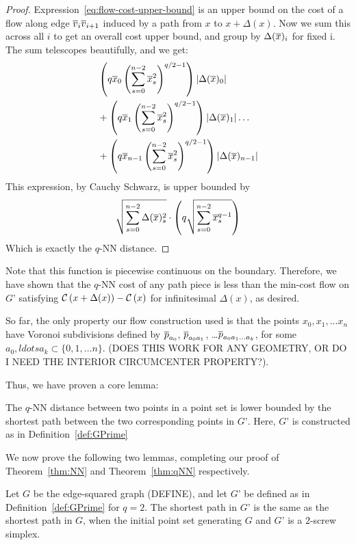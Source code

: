 \begin{proof}
Expression~\ref{eq:flow-cost-upper-bound} is an upper bound on the cost of
a flow along edge $\overline{v}_i\overline{v}_{i+1}$ induced by a path from $x$ to $x+\Delta(x)$. Now we sum this across all $i$ to get an overall cost upper bound, and group by
$\Delta(\overline{x})_i$ for fixed i. The sum telescopes beautifully, and we get:
\begin{align}
&\left(q\overline{x}_0\left(\sum_{s=0}^{n-2} \overline{x}_s^2\right)^{q/2-1}\right)| \Delta(\overline{x})_0|
\\&+
\left(q\overline{x}_1\left(\sum_{s=0}^{n-2} \overline{x}_s^2\right)^{q/2-1}\right)| \Delta(\overline{x})_1|
\ldots
\\& +
\left(q\overline{x}_{n-1}\left(\sum_{s=0}^{n-2} \overline{x}_s^2\right)^{q/2-1}\right)| \Delta(\overline{x})_{n-1}|
\end{align}
This expression, by Cauchy Schwarz, is upper bounded by
\[
\sqrt{\sum_{s=0}^{n-2} \Delta(\overline{x})_s^2} \cdot \left(q\sqrt{\sum_{s=0}^{n-2}
\overline{x}_s^{q-1}}\right)
\]
Which is exactly the $q$-NN distance.

\end{proof}

Note that this function is piecewise continuous on the boundary. Therefore,
we have shown that the $q$-NN cost of any path piece is less than the
min-cost flow on $G’$ satisfying
$\mathcal{C}\left(x+\Delta(x)\right)-\mathcal{C}\left(x\right)$ for infinitesimal
$\Delta(x)$, as desired.

So far, the only property our flow construction used is that the points
$x_0, x_1, \ldots x_n$ have Voronoi subdivisions defined by $\overline{p}_{a_0}$,
$\overline{p}_{a_0a_1}$, \ldots $\overline{p}_{a_0a_1\ldots a_k}$, for some $a_0, ldots a_k
\subset \{0, 1, \ldots n\}$. (DOES THIS WORK FOR ANY GEOMETRY, OR DO I NEED
THE INTERIOR CIRCUMCENTER PROPERTY?).

Thus, we have proven a core lemma:

\begin{lemma}\label{lem:qNN-GPrime}

The $q$-NN distance between two points in a point set is lower bounded by
the shortest path between the two corresponding points in $G’$. Here, $G’$
is constructed as in Definition~\ref{def:GPrime}

\end{lemma}

We now prove the following two lemmas, completing our proof of
Theorem~\ref{thm:NN} and Theorem~\ref{thm:qNN} respectively.

\begin{lemma}\label{lem:edge-squared-GPrime} Let $G$ be the edge-squared graph
(DEFINE), and let $G’$ be defined as in Definition~\ref{def:GPrime} for $q=2$.
The shortest path in $G’$ is the same as the shortest path in $G$, when the
initial point set generating $G$ and $G’$ is a $2$-screw simplex.

\end{lemma}

